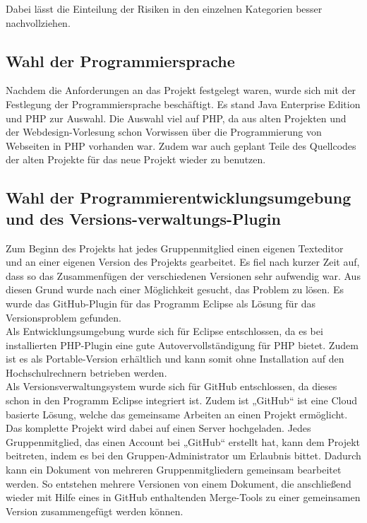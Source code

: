 Dabei lässt die Einteilung der Risiken in den einzelnen Kategorien besser nachvollziehen.

\subsection{Wahl der Programmiersprache}
Nachdem die Anforderungen an das Projekt festgelegt waren, wurde sich mit der Festlegung der Programmiersprache beschäftigt. Es stand Java Enterprise Edition und PHP zur Auswahl. Die Auswahl viel auf PHP, da aus alten Projekten und der Webdesign-Vorlesung schon Vorwissen über die Programmierung von Webseiten in PHP vorhanden war. Zudem war auch geplant Teile des Quellcodes der alten Projekte für das neue Projekt wieder zu benutzen.

\subsection{Wahl der Programmierentwicklungsumgebung und des Versions-verwaltungs-Plugin}
Zum Beginn des Projekts hat jedes Gruppenmitglied einen eigenen Texteditor und an einer eigenen Version des Projekts gearbeitet. Es fiel nach kurzer Zeit auf, dass so das Zusammenfügen der verschiedenen Versionen sehr aufwendig war. Aus diesen Grund wurde nach einer Möglichkeit gesucht, das Problem zu lösen. Es wurde das \glqq GitHub-Plugin\grqq{} für das Programm \glqq Eclipse\grqq{} als Lösung für das Versionsproblem gefunden. \\
Als Entwicklungsumgebung wurde sich für Eclipse entschlossen, da es bei installierten PHP-Plugin eine gute Autovervollständigung für PHP bietet. Zudem ist es als Portable-Version erhältlich und kann somit ohne Installation auf den Hochschulrechnern betrieben werden. \\
Als Versionsverwaltungsystem wurde sich für \glqq GitHub\grqq{} entschlossen, da dieses schon in den Programm \glqq Eclipse\grqq{} integriert ist. Zudem ist „GitHub“ ist eine Cloud basierte Lösung, welche das gemeinsame Arbeiten an einen Projekt ermöglicht. Das komplette Projekt wird dabei auf einen Server hochgeladen. Jedes Gruppenmitglied, das einen Account bei „GitHub“ erstellt hat, kann dem Projekt beitreten, indem es bei den Gruppen-Administrator um Erlaubnis bittet. Dadurch kann ein Dokument von mehreren Gruppenmitgliedern gemeinsam bearbeitet werden. So entstehen mehrere Versionen von einem Dokument, die anschließend wieder mit Hilfe eines in GitHub enthaltenden \glqq Merge-Tools\grqq{} zu einer gemeinsamen Version zusammengefügt werden können.


